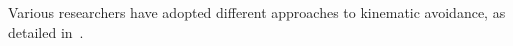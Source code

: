 \documentclass[]{article}
\begin{document}
%
%
%
%
%
%
%
%
%

Various researchers have adopted different approaches to kinematic avoidance, as detailed in~\cite{c30, c39}.
\end{document}
